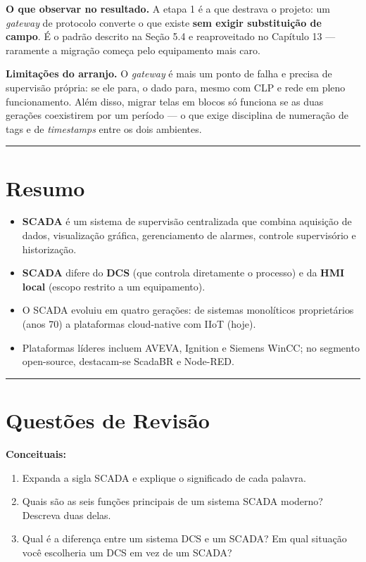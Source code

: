 \textbf{O que observar no resultado.} A etapa 1 é a que destrava o projeto: um \emph{gateway} de protocolo
converte o que existe \textbf{sem exigir substituição de campo}. É o padrão descrito na Seção 5.4 e
reaproveitado no Capítulo 13 --- raramente a migração começa pelo equipamento mais caro.

\textbf{Limitações do arranjo.} O \emph{gateway} é mais um ponto de falha e precisa de supervisão própria:
se ele para, o dado para, mesmo com CLP e rede em pleno funcionamento. Além disso, migrar telas em
blocos só funciona se as duas gerações coexistirem por um período --- o que exige disciplina de
numeração de tags e de \emph{timestamps} entre os dois ambientes.

\begin{center}\rule{0.5\linewidth}{0.5pt}\end{center}

\section{Resumo}\label{resumo}

\begin{itemize}
\tightlist
\item
  \textbf{SCADA} é um sistema de supervisão centralizada que combina aquisição de dados, visualização gráfica, gerenciamento de alarmes, controle supervisório e historização.
\item
  \textbf{SCADA} difere do \textbf{DCS} (que controla diretamente o processo) e da \textbf{HMI local} (escopo restrito a um equipamento).
\item
  O SCADA evoluiu em quatro gerações: de sistemas monolíticos proprietários (anos 70) a plataformas cloud-native com IIoT (hoje).
\item
  Plataformas líderes incluem AVEVA, Ignition e Siemens WinCC; no segmento open-source, destacam-se ScadaBR e Node-RED.
\end{itemize}

\begin{center}\rule{0.5\linewidth}{0.5pt}\end{center}

\section{Questões de Revisão}\label{questuxf5es-de-revisuxe3o}

\textbf{Conceituais:}

\begin{enumerate}
\def\labelenumi{\arabic{enumi}.}
\tightlist
\item
  Expanda a sigla SCADA e explique o significado de cada palavra.
\item
  Quais são as seis funções principais de um sistema SCADA moderno? Descreva duas delas.
\item
  Qual é a diferença entre um sistema DCS e um SCADA? Em qual situação você escolheria um DCS em vez de um SCADA?
\end{enumerate}

